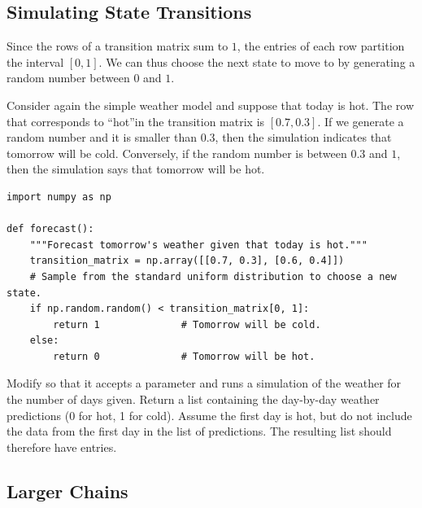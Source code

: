 \subsection*{Simulating State Transitions} %

Since the rows of a transition matrix sum to $1$, the entries of each row partition the interval $[0, 1]$.
We can thus choose the next state to move to by generating a random number between $0$ and $1$.

Consider again the simple weather model and suppose that today is hot.
The row that corresponds to ``hot''in the transition matrix is $[0.7, 0.3]$.
If we generate a random number and it is smaller than $0.3$, then the simulation indicates that tomorrow will be cold.
Conversely, if the random number is between $0.3$ and $1$, then the simulation says that tomorrow will be hot.

\begin{lstlisting}
import numpy as np

def forecast():
	"""Forecast tomorrow's weather given that today is hot."""
	transition_matrix = np.array([[0.7, 0.3], [0.6, 0.4]])
	# Sample from the standard uniform distribution to choose a new state.
	if np.random.random() < transition_matrix[0, 1]:
		return 1              # Tomorrow will be cold.
	else:
		return 0              # Tomorrow will be hot.
\end{lstlisting}

\begin{problem} %
Modify  so that it accepts a parameter  and runs a simulation of the weather for the number of days given.
Return a list containing the day-by-day weather predictions (0 for hot, 1 for cold).
Assume the first day is hot, but do not include the data from the first day in the list of predictions.
The resulting list should therefore have  entries.
\end{problem}


\subsection*{Larger Chains} %

